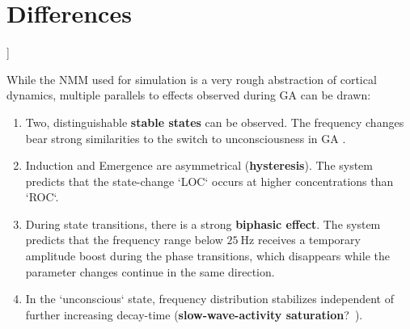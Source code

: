 \section{Differences}
]


While the NMM used for simulation is a very rough abstraction of cortical dynamics,
multiple parallels to effects observed during GA can be drawn:

\begin{enumerate}

    \item Two, distinguishable \textbf{stable states} can be observed.
    The frequency changes bear strong similarities to the switch to unconsciousness in GA
    \cite{purdon_electroencephalogram_2013, ni_mhuircheartaigh_slow_wave_2013}.
    \item Induction and Emergence are asymmetrical (\textbf{hysteresis}).
    The system predicts that the state-change `LOC` occurs at higher concentrations than `ROC`.

    \item During state transitions, there is a strong \textbf{biphasic effect}.
    The system predicts that the frequency range below $\SI{25}{\hertz}$ receives a temporary amplitude boost during
    the phase transitions, which disappears while the parameter changes continue in the same direction.
    \item In the `unconscious` state, frequency distribution stabilizes independent of further increasing decay-time
    (\textbf{slow-wave-activity saturation}?~\cite{ni_mhuircheartaigh_slow_wave_2013}).

\end{enumerate}